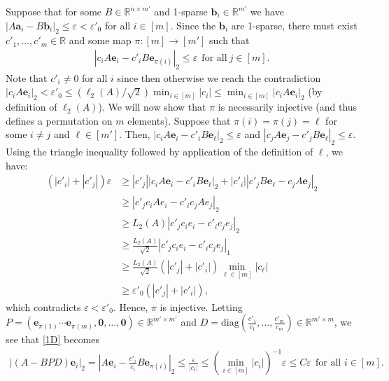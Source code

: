 \documentclass[journal, onecolumn]{IEEEtran}
\begin{document}
Suppose that for some $B \in \mathbb{R}^{n \times m'}$ and 1-sparse $\mathbf{b}_i \in \mathbb{R}^{m'}$ we have  $|A\mathbf{a}_i - B\mathbf{b}_i|_2 \leq \varepsilon < \varepsilon'_0$ for all $i \in [m]$. Since the $\mathbf{b}_i$ are 1-sparse, there must exist $c'_1, \ldots, c'_m \in \mathbb{R}$ and some map $\pi: [m] \to [m']$ such that 
\begin{align}\label{1D}
|c_iA\mathbf{e}_i - c'_iB\mathbf{e}_{\pi(i)}|_2 \leq \varepsilon \ \ \text{for all} \  j \in [m].
\end{align} 
Note that $c'_i \neq 0$ for all $i$ since then otherwise we reach the contradiction $|c_iA\mathbf{e}_i|_2 < \varepsilon'_0 \leq (\ell_2(A)/\sqrt{2}) \min_{i \in [m]}|c_i| \leq \min_{i\in [m]}|c_iA\mathbf{e}_i|_2$ (by definition of $\ell_2(A)$). We will now show that $\pi$ is necessarily injective (and thus defines a permutation on $m$ elements). Suppose that $\pi(i) = \pi(j) = \ell$ for some $i \neq j$ and $\ell \in [m']$. Then, $|c_iA\mathbf{e}_i - c'_iB\mathbf{e}_{\ell}|_2  \leq \varepsilon$ and $|c_jA\mathbf{e}_j - c'_jB\mathbf{e}_{\ell}|_2 \leq \varepsilon$. Using the triangle inequality followed by application of the definition of $\ell$, we have:
\begin{align*}
(|c'_i| + |c'_j|) \varepsilon
&\geq |c'_j||c_iA\mathbf{e}_i - c'_iB\mathbf{e}_{\ell}|_2 + |c'_i||c'_jB\mathbf{e}_{\ell} - c_jA\mathbf{e}_j|_2 \\
&\geq |c'_jc_iAe_i - c'_ic_jAe_j|_2 \\
&\geq L_2(A)|c'_jc_ie_i - c'_ic_je_j|_2 \\
&\geq \frac{L_2(A)}{\sqrt{2}}|c'_jc_ie_i - c'_ic_je_j|_1 \\
&\geq \frac{L_2(A)}{\sqrt{2}} \left( |c'_j| + |c'_i| \right) \min_{\ell \in [m]} |c_\ell | \\
&\geq \varepsilon'_0 \left( |c'_j| + |c'_i| \right),
\end{align*}
%
which contradicts $\varepsilon < \varepsilon'_0$. Hence, $\pi$ is injective. Letting $P = \left( \mathbf{e}_{\pi(1)} \cdots \mathbf{e}_{\pi(m)}, \mathbf{0}, \ldots, \mathbf{0} \right) \in \mathbb{R}^{m' \times m'}$ and $D = \text{diag}(\frac{c'_1}{c_1},\ldots,\frac{c'_m}{c_m}) \in \mathbb{R}^{m' \times m}$, we see that \eqref{1D} becomes 
\begin{align}
|(A - BPD)\mathbf{e}_i|_2 = |A\mathbf{e}_i - \frac{c'_i}{c_i}B\mathbf{e}_{\pi(i)}|_2 \leq \frac{\varepsilon}{|c_i|} \leq (\min_{i \in [m]} |c_i|)^{-1} \varepsilon \leq C\varepsilon \ \ \text{for all } i \in [m].
\end{align}
\end{document}
